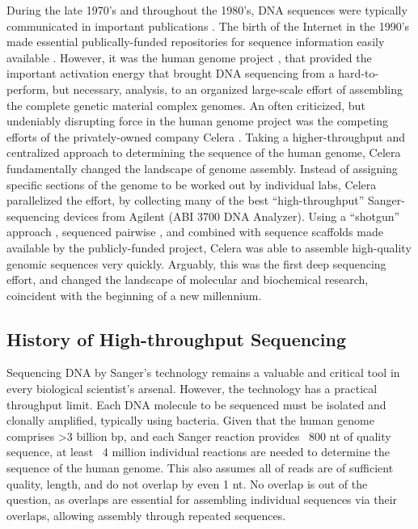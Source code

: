     During the late 1970’s and throughout the 1980’s, DNA sequences were typically communicated in important publications \citep{Cordell1980a,Sanger1978a}. The birth of the Internet in the 1990’s made essential publically-funded repositories for sequence information easily available \citep{Benson2011a}. However, it was the human genome project \citep{Lander2011a,Venter2001}, that provided the important activation energy that brought DNA sequencing from a hard-to-perform, but necessary, analysis, to an organized large-scale effort of assembling the complete genetic material complex genomes. An often criticized, but undeniably disrupting force in the human genome project was the competing efforts of the privately-owned company Celera \citep{Venter2008a}. Taking a higher-throughput and centralized approach to determining the sequence of the human genome, Celera fundamentally changed the landscape of genome assembly. Instead of assigning specific sections of the genome to be worked out by individual labs, Celera parallelized the effort, by collecting many of the best ``high-throughput'' Sanger-sequencing devices from Agilent (ABI 3700 DNA Analyzer). Using a ``shotgun'' approach \citep{Staden1979}, sequenced pairwise \citep{Roach1995}, and combined with sequence scaffolds made available by the publicly-funded project, Celera was able to assemble high-quality genomic sequences very quickly. Arguably, this was the first deep sequencing effort, and changed the landscape of molecular and biochemical research, coincident with the beginning of a new millennium.

  \subsection{History of High-throughput Sequencing}

    Sequencing DNA by Sanger’s technology remains a valuable and critical tool in every biological scientist’s arsenal. However, the technology has a practical throughput limit. Each DNA molecule to be sequenced must be isolated and clonally amplified, typically using bacteria. Given that the human genome \citep{Hattori2005a} comprises >3 billion bp, and each Sanger reaction provides ~800 nt of quality sequence, at least ~4 million individual reactions are needed to determine the sequence of the human genome. This also assumes all of reads are of sufficient quality, length, and do not overlap by even 1 nt. No overlap is out of the question, as overlaps are essential for assembling individual sequences via their overlaps, allowing assembly through repeated sequences. 


